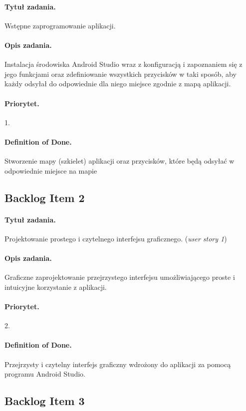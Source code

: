 \documentclass[a4paper]{article}
\begin{document}
\paragraph{Tytuł zadania.} Wstępne zaprogramowanie aplikacji.
\paragraph{Opis zadania.} Instalacja środowiska Android Studio wraz z konfiguracją i zapoznaniem się z jego funkcjami oraz zdefiniowanie wszystkich przycisków w taki sposób, aby każdy odsyłał do odpowiednie dla niego miejsce zgodnie z mapą aplikacji.
\paragraph{Priorytet.} 1.
\paragraph{Definition of Done.} Stworzenie mapy (szkielet) aplikacji oraz przycisków, które będą odsyłać w odpowiednie miejsce na mapie

\subsection{Backlog Item 2}
\paragraph{Tytuł zadania.} Projektowanie prostego i czytelnego interfejsu graficznego. (\textit{user story 1})
\paragraph{Opis zadania.} Graficzne zaprojektowanie przejrzystego interfejsu umożliwiającego proste i intuicyjne korzystanie z aplikacji.
\paragraph{Priorytet.} 2.
\paragraph{Definition of Done.} Przejrzysty i czytelny interfejs graficzny wdrożony do aplikacji za pomocą programu Android Studio.

\subsection{Backlog Item 3}
\end{document}
